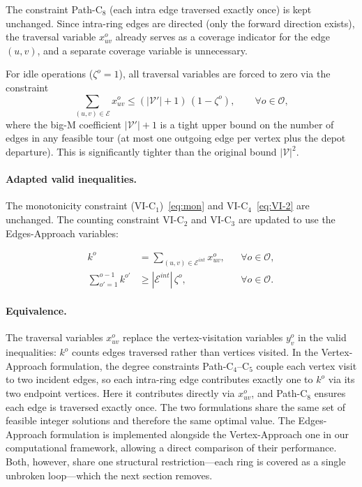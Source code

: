 \documentclass[12pt]{elsarticle}
\begin{document}
The constraint Path-C$_8$ (each intra edge traversed exactly once) is kept unchanged.  Since intra-ring edges are directed (only the forward direction exists), the traversal variable $x_{uv}^o$ already serves as a coverage indicator for the edge $(u,v)$, and a separate coverage variable is unnecessary.

For idle operations ($\zeta^o = 1$), all traversal variables are forced to zero via the constraint
\begin{equation}
    \sum_{(u,v)\in\mathcal E} x_{uv}^o \le (|\mathcal V'|+1)\,(1-\zeta^o), \qquad
    \forall o\in\mathcal O,\label{eq:dp9}\tag{Path-C$_9$}
\end{equation}
where the big-M coefficient $|\mathcal V'|+1$ is a tight upper bound on the number of edges in any feasible tour (at most one outgoing edge per vertex plus the depot departure).  This is significantly tighter than the original bound $|\mathcal V|^2$.

\paragraph{Adapted valid inequalities.}
The monotonicity constraint (VI-C$_1$)~\eqref{eq:mon} and VI-C$_4$~\eqref{eq:VI-2} are unchanged. The counting constraint VI-C$_2$ and VI-C$_3$ are updated to use the Edges-Approach variables:

\begin{align}
    k^o &= \sum_{(u,v)\in\mathcal E^{int}} x_{uv}^o, &&\forall o\in\mathcal O,\label{eq:k_edge}\tag{VI-C$'_2$}\\
    \sum_{o'=1}^{o-1} k^{o'} &\ge |\mathcal E^{int}|\,\zeta^o, &&\forall o\in\mathcal O.\label{eq:vi1_edge}\tag{VI-C$'_3$}
\end{align}

\paragraph{Equivalence.}
The traversal variables $x_{uv}^o$ replace the vertex-visitation variables $y_v^o$ in the valid inequalities: $k^o$ counts edges traversed rather than vertices visited.  In the Vertex-Approach formulation, the degree constraints Path-C$_4$--C$_5$ couple each vertex visit to two incident edges, so each intra-ring edge contributes exactly one to $k^o$ via its two endpoint vertices.  Here it contributes directly via $x_{uv}^o$, and Path-C$_8$ ensures each edge is traversed exactly once.  The two formulations share the same set of feasible integer solutions and therefore the same optimal value.  The Edges-Approach formulation is implemented alongside the Vertex-Approach one in our computational framework, allowing a direct comparison of their performance. Both, however, share one structural restriction---each ring is covered as a single unbroken loop---which the next section removes.
\end{document}
